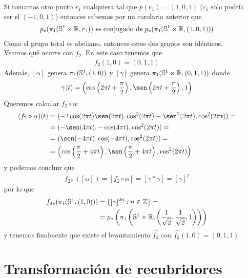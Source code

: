 \begin{ejemplo}
    Si tomamos otro punto $r_1$ cualquiera tal que $p(r_1)=(1,0,1)$ ($r_1$ solo podría ser el $(-1,0,1)$) entonces sabemos por un corolario anterior que 
    \begin{gather*}
        p_*(\pi_1(\mathbb{S}^1\times \mathbb{R}, r_1)) \text{ es conjugado de } p_*(\pi_1(\mathbb{S}^1 \times \mathbb{R}, (1,0,1)))
    \end{gather*}
    Como el grupo total es abeliano, entonces estos dos grupos son idénticos.\\
    
    Veamos qué ocurre con $f_2$. En este caso tenemos que 
    \begin{gather*}
        f_2(1,0) = (0,1,1)
    \end{gather*}
    Además, $[\alpha]$ genera $\pi_1(\mathbb{S}^1, (1,0))$ y $[\gamma]$ genera $\pi_1(\mathbb{S}^1 \times \mathbb{R}, (0,1,1))$ donde 
    \begin{gather*}
        \gamma(t) = \left(\cos\left(2\pi t + \frac{\pi}{2}\right), \sen\left(2\pi t + \frac{\pi}{2}\right), 1\right)
    \end{gather*}
    Queremos calcular $f_2\circ \alpha$:
    \begin{align*}
        (f_2\circ \alpha)(t) &= (-2\cos(2\pi t)\sen(2\pi t), \cos^2(2\pi t) - \sen^2(2\pi t), \cos^2(2\pi t)) = \\
        &= (-\sen(4\pi t), -\cos(4\pi t), \cos^2(2\pi t)) =\\
        &= (\sen(-4\pi t), \cos(-4\pi t), \cos^2(2\pi t)) =\\
        &= \left(\cos\left(\frac{\pi}{2} + 4\pi t\right), \sen\left(\frac{\pi}{2} + 4\pi t\right), \cos^2(2\pi t)\right)
    \end{align*}
    y podemos concluir que 
    \begin{gather*}
        f_{2*}([\alpha]) = [f_2\circ \alpha] = [\gamma \ast \gamma] = [\gamma]^2
    \end{gather*}
    por lo que
    \begin{align*}
        f_{2*}(\pi_1(\mathbb{S}^1,(1,0))) &= \{[\gamma]^{2n} : n\in \mathbb{Z}\} =\\
        &= p_*\left(\pi_1\left(\mathbb{S}^1 \times \mathbb{R}, \left(\frac{1}{\sqrt{2}}, \frac{1}{\sqrt{2}}, 1\right)\right) \right) 
    \end{align*}
    y tenemos finalmente que existe el levantamiento $\hat{f_2}$ con $\hat{f_2}(1,0)=(0,1,1)$
\end{ejemplo}

\section{Transformación de recubridores}


